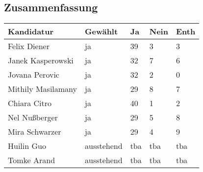 \subsection{Zusammenfassung}
\begin{center}
    \begin{tabular}{|p{6cm}|m{2cm}|m{1cm}|m{1cm}|m{1cm}|}
        \hline
        Kandidatur & Gewählt & Ja & Nein & Enth\\\hline
        Felix Diener & ja & 39 & 3 & 3\\\hline
        Janek Kasperowski & ja & 32 & 7 & 6\\\hline
        Jovana Perovic & ja & 32 & 2 & 0\\\hline
        Mithily Masilamany & ja & 29 & 8 & 7\\\hline
        Chiara Citro & ja & 40 & 1 & 2\\\hline
        Nel Nußberger & ja & 29 & 5 & 8\\\hline
        Mira Schwarzer & ja & 29 & 4 & 9\\\hline
        Huilin Guo & ausstehend & tba & tba & tba \\\hline
        Tomke Arand & ausstehend & tba & tba & tba \\\hline
    \end{tabular}
\end{center}